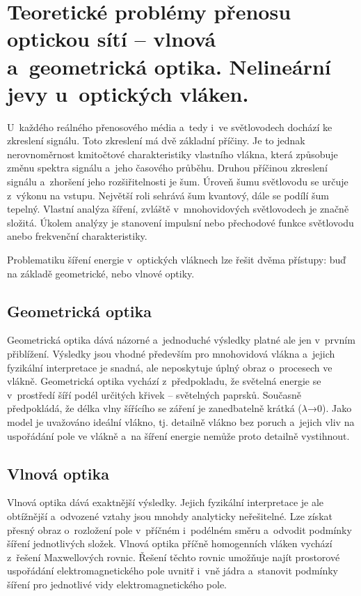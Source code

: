 \clearpage
\section{Teoretické problémy přenosu optickou sítí – vlnová a~geometrická optika. Nelineární jevy u~optických vláken.}

U~každého reálného přenosového média a~tedy i~ve světlovodech dochází ke zkreslení signálu. Toto zkreslení má dvě základní příčiny. Je to jednak nerovnoměrnost kmitočtové charakteristiky vlastního vlákna, která způsobuje změnu spektra signálu a~jeho časového průběhu. Druhou příčinou zkreslení signálu a~zhoršení jeho rozšiřitelnosti je šum. Úroveň šumu světlovodu se určuje z~výkonu na vstupu. Největší roli sehrává šum kvantový, dále se podílí šum tepelný. Vlastní analýza šíření, zvláště v~mnohovidových světlovodech je značně složitá. Úkolem analýzy je stanovení impulsní nebo přechodové funkce světlovodu anebo frekvenční charakteristiky.

Problematiku šíření energie v~optických vláknech lze řešit dvěma přístupy: buď na základě geometrické, nebo vlnové optiky.

\subsection{Geometrická optika}
Geometrická optika dává názorné a~jednoduché výsledky platné ale jen v~prvním přiblížení. Výsledky jsou vhodné především pro mnohovidová vlákna a~jejich fyzikální interpretace je snadná, ale neposkytuje úplný obraz o~procesech ve vlákně. Geometrická optika vychází z~předpokladu, že světelná energie se v~prostředí šíří podél určitých křivek – světelných paprsků. Současně předpokládá, že délka vlny šířícího se záření je zanedbatelně krátká ($\lambda$→0). Jako model je uvažováno ideální vlákno, tj. detailně vlákno bez poruch a~jejich vliv na uspořádání pole ve vlákně a~na šíření energie nemůže proto detailně vystihnout.

\subsection{Vlnová optika}
Vlnová optika dává exaktnější výsledky. Jejich fyzikální interpretace je ale obtížnější a~odvozené vztahy jsou mnohdy analyticky neřešitelné. Lze získat přesný obraz o~rozložení pole v~příčném i~podélném směru a~odvodit podmínky šíření jednotlivých složek. Vlnová optika příčně homogenních vláken vychází z~řešení Maxwellových rovnic. Řešení těchto rovnic umožňuje najít prostorové uspořádání elektromagnetického pole uvnitř i~vně jádra a~stanovit podmínky šíření pro jednotlivé vidy elektromagnetického pole.

